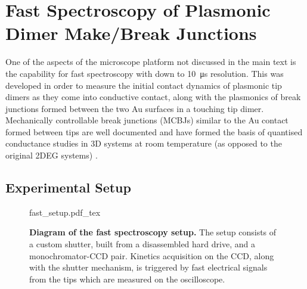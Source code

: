 \documentclass[12pt, a4paper, twoside]{book}
\begin{document}
\chapter{Fast Spectroscopy of Plasmonic Dimer Make/Break Junctions}

One of the aspects of the microscope platform not discussed in the main text is the capability for fast spectroscopy with down to \SI{10}{\micro\second} resolution. This was developed in order to measure the initial contact dynamics of plasmonic tip dimers as they come into conductive contact, along with the plasmonics of  break junctions formed between the two Au surfaces in a touching tip dimer. Mechanically controllable break junctions (MCBJs) similar to the Au contact formed between tips are well documented and have formed the basis of quantised conductance studies in 3D systems at room temperature (as opposed to the original 2DEG systems) \cite{armstrong2010channel, costa1997conductance, costa1997conductance2, costa1997conductance3, landman1996reversible, natelson2012mechanical, rodrigues2000signature, rodrigues2002quantum, sabater2012mechanical, sorensen1998mechanical, yanson2005atomic}.

\FloatBarrier
\section{Experimental Setup}

\begin{figure}[bt]
\centering
\fontsize{10pt}{1em}\selectfont
\def\svgwidth{0.69\textwidth}
{fast_setup.pdf_tex}
\caption[Diagram of the fast spectroscopy setup]{\textbf{Diagram of the fast spectroscopy setup.} The setup consists of a custom shutter, built from a disassembled hard drive, and a monochromator-CCD pair. Kinetics acquisition on the CCD, along with the shutter mechanism, is triggered by fast electrical signals from the tips which are measured on the oscilloscope.}
\label{fig:fast_setup}
\end{figure}
\end{document}
